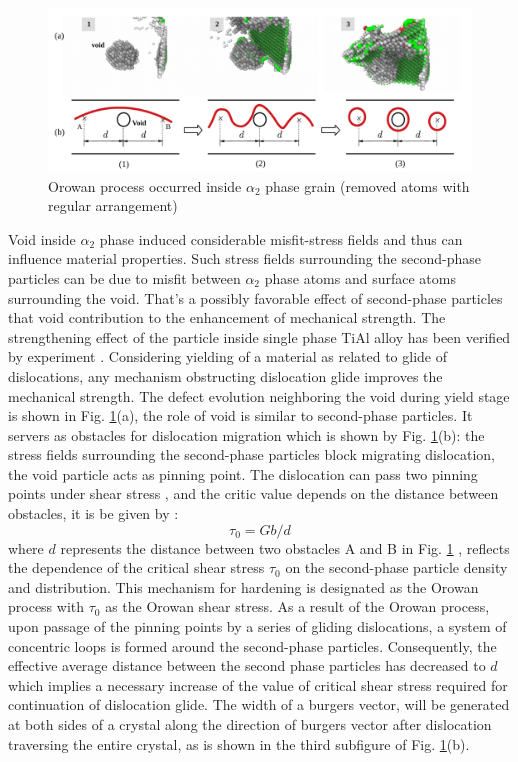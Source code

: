 \documentclass[materials,article,submit,moreauthors,pdftex,10pt,a4paper]{Definitions/mdpi}
\begin{document}
\begin{figure}[ht]
	\centering
	\includegraphics[width=1\linewidth]{"img/orowan"}
	\caption{Orowan process occurred inside $\alpha_2$ phase grain (removed atoms with regular arrangement)}
	\label{fig:orowan}
\end{figure}
Void inside $\alpha_2$ phase induced considerable misfit-stress fields and thus can influence material properties. Such stress fields surrounding the second-phase particles can be due to misfit between $\alpha_2$ phase atoms and surface atoms surrounding the void. That's a possibly favorable effect of second-phase particles that void contribution to the enhancement of mechanical strength. The strengthening effect of the particle inside single phase TiAl alloy has been verified by experiment \cite{Zghal1998}. Considering yielding of a material as related to glide of dislocations, any mechanism obstructing dislocation glide improves the mechanical strength. The defect evolution neighboring the void during yield stage is shown in Fig. \ref{fig:orowan}(a), the role of void is similar to second-phase particles. It servers as obstacles for dislocation migration which is shown by Fig. \ref{fig:orowan}(b): the stress fields surrounding the second-phase particles block migrating dislocation, the void particle acts as pinning point. The dislocation can pass two pinning points under shear  stress , and the critic value depends on the distance between  obstacles, it is be given by \cite{Xiong2015}:
\begin{equation} \label{eq:orowan} 
\tau_0 = Gb/d
\end{equation}
where $d$ represents the distance between two obstacles A and B in Fig. \ref{fig:orowan} , reflects the dependence of the critical shear stress $\tau_0$ on the second-phase particle density and distribution. This mechanism for hardening is designated as the Orowan process with $\tau_0$ as the Orowan shear stress. As a result of the Orowan process, upon passage of the pinning points by a series of gliding dislocations, a system of concentric loops is formed around the second-phase particles. Consequently, the effective average distance between the second phase particles has decreased to $d$ which implies a necessary increase of the value of critical shear stress required for continuation of dislocation glide. The width of a burgers vector, will be generated at both sides of a crystal along the direction of  burgers vector after dislocation traversing the entire crystal, as is shown in the third subfigure of Fig. \ref{fig:orowan}(b). 
\end{document}
